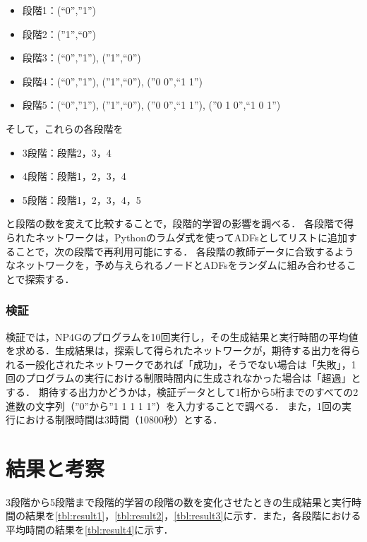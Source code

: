 \documentclass[exploratorypaper]{jsaiart} %
\begin{document}
\begin{itemize}
    \item 段階1：(“0”,”1”)
    \item 段階2：(”1”,“0”)
    \item 段階3：(“0”,”1”), (”1”,“0”)
    \item 段階4：(“0”,”1”), (”1”,“0”), (”0 0”,“1 1”)
    \item 段階5：(“0”,”1”), (”1”,“0”), (”0 0”,“1 1”), (”0 1 0”,“1 0 1”)
\end{itemize}

そして，これらの各段階を

\begin{itemize}
    \item 3段階：段階2，3，4
    \item 4段階：段階1，2，3，4
    \item 5段階：段階1，2，3，4，5
\end{itemize}
\noindent
と段階の数を変えて比較することで，段階的学習の影響を調べる．
各段階で得られたネットワークは，Pythonのラムダ式を使ってADFsとしてリストに追加することで，次の段階で再利用可能にする．
各段階の教師データに合致するようなネットワークを，予め与えられるノードとADFsをランダムに組み合わせることで探索する．

\subsubsection{検証}
検証では，NP4Gのプログラムを10回実行し，その生成結果と実行時間の平均値を求める．生成結果は，探索して得られたネットワークが，期待する出力を得られる一般化されたネットワークであれば「成功」，そうでない場合は「失敗」，1回のプログラムの実行における制限時間内に生成されなかった場合は「超過」とする．
期待する出力かどうかは，検証データとして1桁から5桁までのすべての2進数の文字列（”0”から”1 1 1 1 1”）を入力することで調べる．
また，1回の実行における制限時間は3時間（10800秒）とする．

\section{結果と考察}
3段階から5段階まで段階的学習の段階の数を変化させたときの生成結果と実行時間の結果を\ref{tbl:result1}，\ref{tbl:result2}，\ref{tbl:result3}に示す．また，各段階における平均時間の結果を\ref{tbl:result4}に示す．
\end{document}
